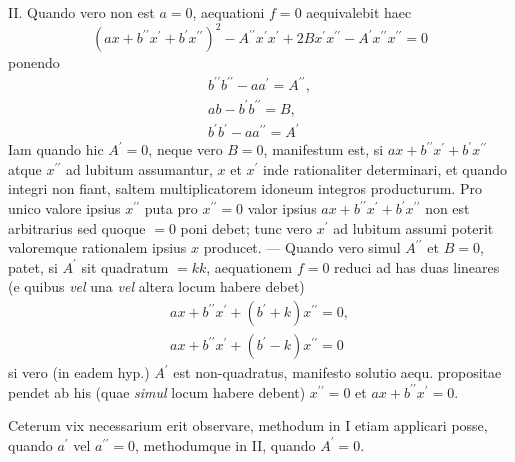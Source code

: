 II. Quando vero non est \(a=0\), aequationi \(f=0\) aequivalebit haec 
\[(ax+b^{\prime\prime}x^\prime+b^\prime x^{\prime\prime})^2-A^{\prime\prime}x^\prime x^\prime+2B x^\prime x^{\prime\prime}-A^\prime x^{\prime\prime}x^{\prime\prime}=0\]
 ponendo 
\[\begin{gathered}b^{\prime\prime}b^{\prime\prime}-aa^\prime=A^{\prime\prime},\\ ab-b^\prime b^{\prime\prime}=B,\\ b^\prime b^\prime-aa^{\prime\prime}=A^\prime\end{gathered}\]
 Iam quando hic \(A^\prime=0\), neque vero \(B=0\), manifestum est, si \(ax+b^{\prime\prime}x^\prime+b^\prime x^{\prime\prime}\) atque \(x^{\prime\prime}\) ad lubitum assumantur, \(x\) et \(x^\prime\) inde rationaliter determinari, et quando integri non fiant, saltem multiplicatorem idoneum integros producturum. Pro unico valore ipsius \(x^{\prime\prime}\) puta pro \(x^{\prime\prime}=0\) valor ipsius \(ax+b^{\prime\prime}x^\prime+b^\prime x^{\prime\prime}\) non est arbitrarius sed quoque \(=0\) poni debet; tunc vero \(x^\prime\) ad lubitum assumi poterit valoremque rationalem ipsius \(x\) producet. — Quando vero simul \(A^{\prime\prime}\) et \(B=0\), patet, si \(A^\prime\) sit quadratum \(=kk\), aequationem \(f=0\) reduci ad has duas lineares (e quibus \textit{vel} una \textit{vel} altera locum habere debet) 
\[\begin{gathered}ax+b^{\prime\prime}x^\prime+(b^\prime+k)x^{\prime\prime}=0,\\ ax+b^{\prime\prime}x^\prime+(b^\prime-k)x^{\prime\prime}=0\end{gathered}\]
 si vero (in eadem hyp.) \(A^\prime\) est non-quadratus, manifesto solutio aequ. propositae pendet ab his (quae \textit{simul} locum habere debent) \(x^{\prime\prime}=0\) et \(ax+b^{\prime\prime}x^\prime=0\).

Ceterum vix necessarium erit observare, methodum in I etiam applicari posse, quando \(a^\prime\) vel \(a^{\prime\prime}=0\), methodumque in II, quando \(A^\prime=0\).

